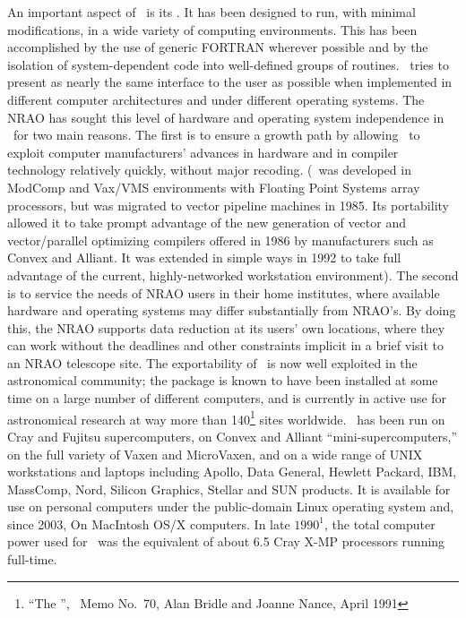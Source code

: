     An important aspect of \AIPS\ is its .  It has
been designed to run, with minimal modifications, in a wide variety of
computing environments.  This has been accomplished by the use of
generic FORTRAN wherever possible and by the isolation of
system-dependent code into well-defined groups of routines.  \AIPS\
tries to present as nearly the same interface to the user as possible
when implemented in different computer architectures and under
different operating systems.  The NRAO has sought this level of
hardware and operating system independence in \AIPS\ for two main
reasons.  The first is to ensure a growth path by allowing \AIPS\ to
exploit computer manufacturers' advances in hardware and in compiler
technology relatively quickly, without major recoding.  (\AIPS\ was
developed in ModComp and Vax/VMS environments with Floating Point
Systems array processors, but was migrated to vector pipeline machines
in 1985.  Its portability allowed it to take prompt advantage of the
new generation of vector and vector/parallel optimizing compilers
offered in 1986 by manufacturers such as Convex and Alliant.  It was
extended in simple ways in 1992 to take full advantage of the current,
highly-networked workstation environment).  The second is to service
the needs of NRAO users in their home institutes, where available
hardware and operating systems may differ substantially from NRAO's.
By doing this, the NRAO supports data reduction at its users' own
locations, where they can work without the deadlines and other
constraints implicit in a brief visit to an NRAO telescope site.  The
exportability of \AIPS\ is now well exploited in the astronomical
community; the package is known to have been installed at some time on
a large number of different computers, and is currently in active use
for astronomical research at way more than 140\footnote{``The
'', \AIPS\ Memo No.~70, Alan Bridle and
Joanne Nance, April 1991} sites worldwide.  \AIPS\ has been run on
Cray and Fujitsu supercomputers, on Convex and Alliant
``mini-supercomputers,'' on the full variety of Vaxen and MicroVaxen,
and on a wide range of UNIX workstations and laptops including Apollo,
Data General, Hewlett Packard, IBM, MassComp, Nord, Silicon Graphics,
Stellar and SUN products.  It is available for use on personal
computers under the public-domain Linux operating system and, since
2003, On MacIntosh OS/X computers.  In late $1990^1$, the total
computer power used for \AIPS\ was the equivalent of about 6.5 Cray
X-MP processors running full-time.

